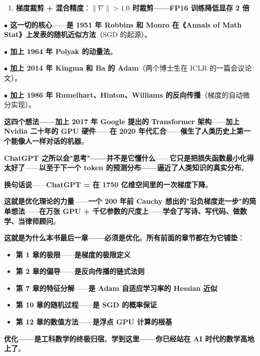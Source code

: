 \begin{tcolorbox}[ahabox={\Large Aha：ChatGPT 训练 —— 优化理论 70 年的总和成就}]
\begin{enumerate}
\item \textbf{梯度裁剪 + 混合精度}：\textbf{$\|\nabla\| > 1.0$ 时裁剪——FP16 训练降低显存 2 倍}
\end{enumerate}

\medskip

\textbf{$\bullet$ 这一切的核心}——\textbf{是 1951 年 Robbins 和 Monro 在《Annals of Math Stat》上发表的\textbf{随机近似}方法}（SGD 的起源）。

\textbf{$\bullet$ 加上 1964 年 Polyak 的\textbf{动量法}}。

\textbf{$\bullet$ 加上 2014 年 Kingma 和 Ba 的 \textbf{Adam}}（两个博士生在 ICLR 的一篇会议论文）。

\textbf{$\bullet$ 加上 1986 年 Rumelhart、Hinton、Williams 的\textbf{反向传播}}（梯度的自动微分实现）。

\medskip

\textbf{这四个想法——加上 2017 年 Google 提出的 \textbf{Transformer 架构}}——\textbf{加上 Nvidia 二十年的 \textbf{GPU 硬件}}——\textbf{在 2020 年代汇合}——\textbf{催生了人类历史上\textbf{第一个能像人一样对话}的机器}。

\medskip

\textbf{ChatGPT 之所以会"思考"——并不是它\textbf{懂}什么}——\textbf{它只是\textbf{把损失函数最小化得太好了}}——\textbf{以至于\textbf{下一个 token 的预测分布}——逼近了\textbf{人类知识的真实分布}}。

\medskip

\textbf{换句话说}——\textbf{ChatGPT = \textbf{在 1750 亿维空间里的一次梯度下降}}。

\medskip

\textbf{这就是\textbf{优化理论的力量}}——\textbf{一个 200 年前 Cauchy 想出的"沿负梯度走一步"的简单想法}——\textbf{在万张 GPU + 千亿参数的尺度上}——\textbf{学会了写诗、写代码、做数学、当律师顾问}。

\medskip

\textbf{这就是为什么本书最后一章——必须是优化}。\textbf{所有前面的章节都在为它\textbf{铺垫}}：

\begin{itemize}
\item \textbf{第 1 章的极限}——\textbf{是梯度的极限定义}
\item \textbf{第 2 章的偏导}——\textbf{是反向传播的链式法则}
\item \textbf{第 7 章的特征分解}——\textbf{是 Adam 自适应学习率的 Hessian 近似}
\item \textbf{第 10 章的随机过程}——\textbf{是 SGD 的概率保证}
\item \textbf{第 12 章的数值方法}——\textbf{是浮点 GPU 计算的根基}
\end{itemize}

\medskip

\textbf{优化——是工科数学的\textbf{终极归宿}}。\textbf{学到这里——你已经站在 AI 时代的数学高地上了}。
\end{tcolorbox}

